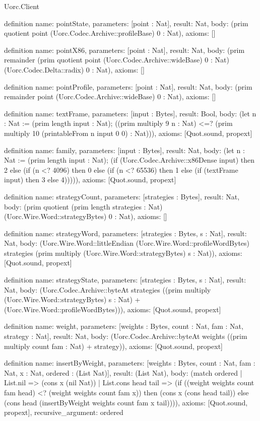 \begin{lexlean}{Uorc.Client}
\begin{semanticmodule}
definition{
  name: pointState,
  parameters: [point : Nat],
  result: Nat,
  body: (prim quotient point (Uorc.Codec.Archive::profileBase) 0 : Nat),
  axioms: []
}

definition{
  name: pointX86,
  parameters: [point : Nat],
  result: Nat,
  body: (prim remainder (prim quotient point (Uorc.Codec.Archive::wideBase) 0 : Nat) (Uorc.Codec.Delta::radix) 0 : Nat),
  axioms: []
}

definition{
  name: pointProfile,
  parameters: [point : Nat],
  result: Nat,
  body: (prim remainder point (Uorc.Codec.Archive::wideBase) 0 : Nat),
  axioms: []
}

definition{
  name: textFrame,
  parameters: [input : Bytes],
  result: Bool,
  body: (let n : Nat := (prim length input : Nat); ((prim multiply 9 n : Nat) <=? (prim multiply 10 (printableFrom n input 0 0) : Nat))),
  axioms: [Quot.sound, propext]
}

definition{
  name: family,
  parameters: [input : Bytes],
  result: Nat,
  body: (let n : Nat := (prim length input : Nat); (if (Uorc.Codec.Archive::x86Dense input) then 2 else (if (n <? 4096) then 0 else (if (n <? 65536) then 1 else (if (textFrame input) then 3 else 4))))),
  axioms: [Quot.sound, propext]
}

definition{
  name: strategyCount,
  parameters: [strategies : Bytes],
  result: Nat,
  body: (prim quotient (prim length strategies : Nat) (Uorc.Wire.Word::strategyBytes) 0 : Nat),
  axioms: []
}

definition{
  name: strategyWord,
  parameters: [strategies : Bytes, s : Nat],
  result: Nat,
  body: (Uorc.Wire.Word::littleEndian (Uorc.Wire.Word::profileWordBytes) strategies (prim multiply (Uorc.Wire.Word::strategyBytes) s : Nat)),
  axioms: [Quot.sound, propext]
}

definition{
  name: strategyState,
  parameters: [strategies : Bytes, s : Nat],
  result: Nat,
  body: (Uorc.Codec.Archive::byteAt strategies ((prim multiply (Uorc.Wire.Word::strategyBytes) s : Nat) + (Uorc.Wire.Word::profileWordBytes))),
  axioms: [Quot.sound, propext]
}

definition{
  name: weight,
  parameters: [weights : Bytes, count : Nat, fam : Nat, strategy : Nat],
  result: Nat,
  body: (Uorc.Codec.Archive::byteAt weights ((prim multiply count fam : Nat) + strategy)),
  axioms: [Quot.sound, propext]
}

definition{
  name: insertByWeight,
  parameters: [weights : Bytes, count : Nat, fam : Nat, x : Nat, ordered : (List Nat)],
  result: (List Nat),
  body: (match ordered
    | List.nil => (cons x (nil Nat))
    | List.cons head tail => (if ((weight weights count fam head) <? (weight weights count fam x)) then (cons x (cons head tail)) else (cons head (insertByWeight weights count fam x tail)))),
  axioms: [Quot.sound, propext],
  recursive_argument: ordered
}


\end{semanticmodule}
\end{lexlean}
